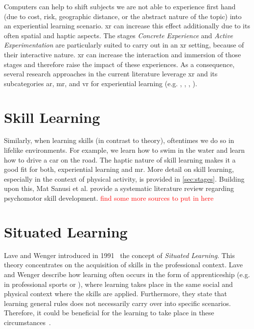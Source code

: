 Computers can help to shift subjects we are not able to experience first hand (due to cost, risk, geographic distance, or the abstract nature of the topic) into an experiential learning scenario. \Acrfull{xr} can increase this effect additionally due to its often spatial and haptic aspects.
The stages \emph{Concrete Experience} and \emph{Active Experimentation} are particularly suited to carry out in an \acrshort{xr} setting, because of their interactive nature. \acrshort{xr} can increase the interaction and immersion of those stages and therefore raise the impact of these experiences.
As a consequence, several research approaches in the current literature leverage \acrshort{xr} and its subcategories \acrshort{ar}, \acrshort{mr}, and \acrshort{vr} for experiential learning (e.g. \cite{asad2021virtual}, \cite{majgaard2020virtual}, \cite{wang2007experiential}, \cite{pueschel:2013:MRCG}).

\section{Skill Learning \label{sec:skill}}
Similarly, when learning skills (in contrast to theory), oftentimes we do so in lifelike environments. For example, we learn how to swim in the water and learn how to drive a car on the road. The haptic nature of skill learning makes it a good fit for both, experiential learning and \acrshort{mr}. More detail on skill learning, especially in the context of physical activity, is provided in \autoref{sec:stages}. Building upon this, Mat Sanusi et al. \cite{mat2025virtual} provide a systematic literature review regarding psychomotor skill development. \textcolor{red}{find some more sources to put in here}

\section{Situated Learning \label{sec:situated}}
Lave and Wenger introduced in 1991~\cite{lave:wenger:1991} the concept of \emph{Situated Learning}. This theory concentrates on the acquisition of skills in the professional context. Lave and Wenger describe how learning often occurs in the form of apprenticeship (e.g. in professional sports or ), where learning takes place in the same social and physical context where the skills are applied. Furthermore, they state that learning general rules does not necessarily carry over into specific scenarios. Therefore, it could be beneficial for the learning to take place in these circumstances~\cite[p. 34]{lave:wenger:1991}.